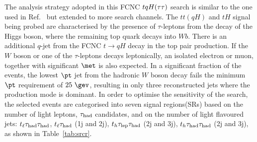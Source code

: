 \documentclass[PAPER, coverpage, atlasdraft=true, texlive=2016, UKenglish]{\ATLASLATEXPATH atlasdoc} %
\begin{document}
The analysis strategy adopted in this FCNC $tqH(\tau\tau)$ search is similar to the one used in Ref.~\cite{fcnc36,Chen:2015nta} but extended to more search channels.
The $tt(qH)$ and $tH$ signal being probed are characterised by the presence of $\tau$-leptons from the decay of 
the Higgs boson, where the remaining top quark decays into $Wb$. There is an additional $q$-jet from the FCNC $t\to qH$ decay in the top pair production. 
If the $W$ boson or one of the $\tau$-leptons decays leptonically, an isolated electron or muon, together with significant $\met$ is also expected.
In a significant fraction of the events, the lowest $\pt$ jet from the hadronic $W$ boson decay fails the minimum $\pt$ requirement of $25~\gev$,
resulting in only three reconstructed jets where the production mode is dominant. 
In order to optimise the sensitivity of the search, the selected events are categorised into seven signal regions(SRs) based on the number of light leptons,
$\tau_{\mathrm{had}}$ candidates, and on the number of light flavoured jets:
$t_{\ell}\tau_{\mathrm{had}} \tau_{\mathrm{had}}$, $t_{\ell}\tau_{\mathrm{had}}$ (1j and 2j), $t_h\tau_{\mathrm{lep}} \tau_{\mathrm{had}}$ (2j and 3j), $t_h\tau_{\mathrm{had}} \tau_{\mathrm{had}}$ (2j and 3j), as shown in Table~\ref{tab:srcr}. 
\end{document}
